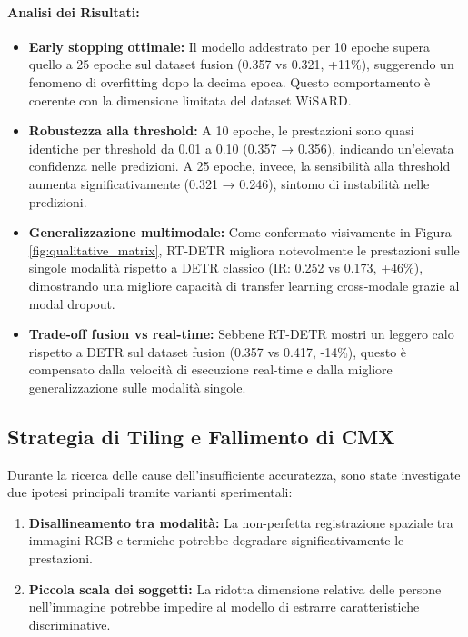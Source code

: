 \documentclass[a4paper,12pt]{article}
\begin{document}

\paragraph{Analisi dei Risultati:}
\begin{itemize}
    \item \textbf{Early stopping ottimale:} Il modello addestrato per 10 epoche supera quello a 25 epoche sul dataset fusion (0.357 vs 0.321, +11\%), suggerendo un fenomeno di overfitting dopo la decima epoca. Questo comportamento è coerente con la dimensione limitata del dataset WiSARD.
    
    \item \textbf{Robustezza alla threshold:} A 10 epoche, le prestazioni sono quasi identiche per threshold da 0.01 a 0.10 (0.357 → 0.356), indicando un'elevata confidenza nelle predizioni. A 25 epoche, invece, la sensibilità alla threshold aumenta significativamente (0.321 → 0.246), sintomo di instabilità nelle predizioni.
    
    \item \textbf{Generalizzazione multimodale:} Come confermato visivamente in Figura \ref{fig:qualitative_matrix}, RT-DETR migliora notevolmente le prestazioni sulle singole modalità rispetto a DETR classico (IR: 0.252 vs 0.173, +46\%), dimostrando una migliore capacità di transfer learning cross-modale grazie al modal dropout.
    
    \item \textbf{Trade-off fusion vs real-time:} Sebbene RT-DETR mostri un leggero calo rispetto a DETR sul dataset fusion (0.357 vs 0.417, -14\%), questo è compensato dalla velocità di esecuzione real-time e dalla migliore generalizzazione sulle modalità singole.
\end{itemize}


\subsection{Strategia di Tiling e Fallimento di CMX}

Durante la ricerca delle cause dell'insufficiente accuratezza, sono state investigate due ipotesi principali tramite varianti sperimentali:
\begin{enumerate}
    \item \textbf{Disallineamento tra modalità:} La non-perfetta registrazione spaziale tra immagini RGB e termiche potrebbe degradare significativamente le prestazioni.
    \item \textbf{Piccola scala dei soggetti:} La ridotta dimensione relativa delle persone nell'immagine potrebbe impedire al modello di estrarre caratteristiche discriminative.
\end{enumerate}
\end{document}
